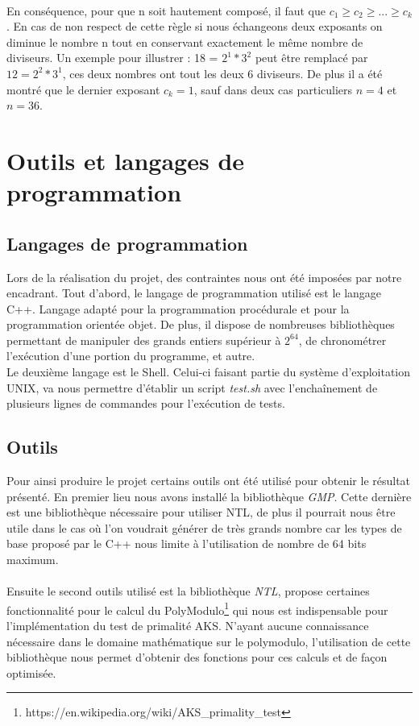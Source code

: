 		\paragraph{}En conséquence, pour que n soit hautement composé, il faut que $c_1 \ge c_2 \ge ... \ge c_k$. En cas de non respect de cette règle si nous échangeons deux exposants on diminue le nombre n tout en conservant exactement le même nombre de diviseurs. Un exemple pour illustrer : 18 = $2^1 * 3^2$ peut être remplacé par $12 = 2^2 * 3^1$, ces deux nombres ont tout les deux 6 diviseurs. De plus il a été montré que le dernier exposant $c_k = 1$, sauf dans deux cas particuliers $n = 4$ et $n = 36$.

	\section{Outils et langages de programmation}
		\subsection{Langages de programmation}
		Lors de la réalisation du projet, des contraintes nous ont été imposées par notre encadrant. Tout d'abord, le langage de programmation utilisé est le langage C++. Langage adapté pour la programmation procédurale et pour la programmation orientée objet. De plus, il dispose de nombreuses bibliothèques permettant de manipuler des grands entiers supérieur à $2^{64}$, de chronométrer l'exécution d'une portion du programme, et autre.\\
		Le deuxième langage est le Shell. Celui-ci faisant partie du système d'exploitation UNIX, va nous permettre d'établir un script \textit{test.sh} avec l’enchaînement de plusieurs lignes de commandes pour l'exécution de tests.
		
		\subsection{Outils}
		Pour ainsi produire le projet certains outils ont été utilisé pour obtenir le résultat présenté. En premier lieu nous avons installé la bibliothèque \textit{GMP}. Cette dernière est une bibliothèque nécessaire pour utiliser NTL, de plus il pourrait nous être utile dans le cas où l'on voudrait générer de très grands nombre car les types de base proposé par le C++ nous limite à l'utilisation de nombre de 64 bits maximum.
		\paragraph{}Ensuite le second outils utilisé est la bibliothèque \textit{NTL}, propose certaines fonctionnalité pour le calcul du PolyModulo\footnote{https://en.wikipedia.org/wiki/AKS\_primality\_test} qui nous est indispensable pour l'implémentation du test de primalité AKS. N'ayant aucune connaissance nécessaire dans le domaine mathématique sur le polymodulo, l'utilisation de cette bibliothèque nous permet d'obtenir des fonctions pour ces calculs et de façon optimisée.  
